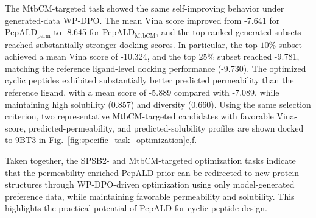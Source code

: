 The MtbCM-targeted task showed the same self-improving behavior under generated-data WP-DPO.
The mean Vina score improved from \mbox{-7.641} for PepALD$_{\mathrm{perm}}$ to \mbox{-8.645} for PepALD$_{\mathrm{MtbCM}}$, and the top-ranked generated subsets reached substantially stronger docking scores.
In particular, the top $10\%$ subset achieved a mean Vina score of -10.324, and the top $25\%$ subset reached -9.781, matching the reference ligand-level docking performance (-9.730).
The optimized cyclic peptides exhibited substantially better predicted permeability than the reference ligand, with a mean score of -5.889 compared with -7.089, while maintaining high solubility (0.857) and diversity (0.660).
Using the same selection criterion, two representative MtbCM-targeted candidates with favorable Vina-score, predicted-permeability, and predicted-solubility profiles are shown docked to 9BT3 in Fig.~\ref{fig:specific_task_optimization}e,f.

Taken together, the SPSB2- and MtbCM-targeted optimization tasks indicate that the permeability-enriched PepALD prior can be redirected to new protein structures through WP-DPO-driven optimization using only model-generated preference data, while maintaining favorable permeability and solubility.
This highlights the practical potential of PepALD for cyclic peptide design.

